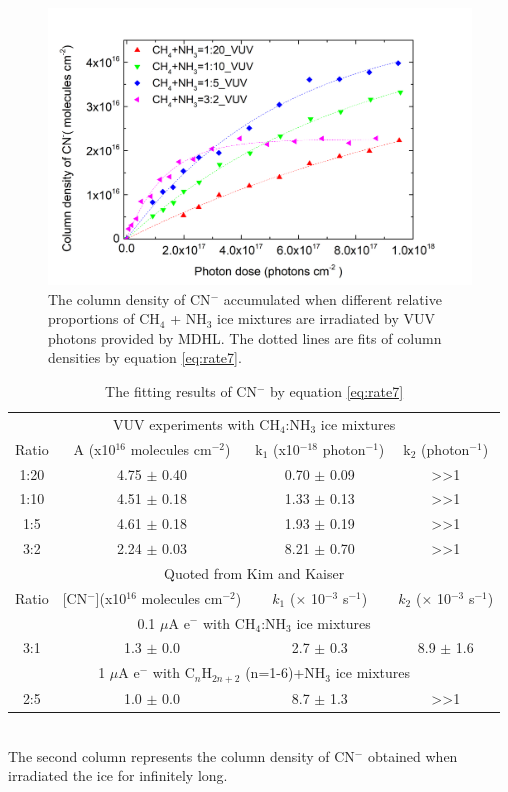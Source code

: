 \begin{figure}
\centering
\includegraphics[width=\textwidth]{figures/chapter3/CN_rate_VUV.png}
\caption{The column density of CN$^-$ accumulated when different relative proportions of CH$_4$ + NH$_3$ ice mixtures are irradiated by VUV photons provided by MDHL. The dotted lines are fits of column densities by equation \ref{eq:rate7}.}
\label{fig:CNrate}
\end{figure}

\begin{table}[htbp]
\caption{The fitting results of CN$^-$ by equation \ref{eq:rate7}}
\label{tab:CNrate}
\begin{tabular}{cccc}
\hline
\hline
\multicolumn{4}{c}{VUV experiments with CH$_4$:NH$_3$ ice mixtures}\\
Ratio & A (x10$^{16}$ molecules cm$^{-2}$) & k$_1$ (x10$^{-18}$ photon$^{-1}$) & k$_2$ (photon$^{-1}$)\\
\hline
1:20 & 4.75 $\pm$ 0.40 & 0.70 $\pm$ 0.09 & >>1 \\
1:10 & 4.51 $\pm$ 0.18 & 1.33 $\pm$ 0.13 & >>1 \\
1:5 & 4.61 $\pm$ 0.18 & 1.93 $\pm$ 0.19 & >>1 \\
3:2 & 2.24 $\pm$ 0.03 & 8.21 $\pm$ 0.70 & >>1 \\
\hline
\hline
\multicolumn{4}{c}{Quoted from Kim and Kaiser\cite{kim}} \\
Ratio & [CN$^-$](x10$^{16}$ molecules cm$^{-2}$) & $k_1$ ($\times$ 10$^{-3}$ s$^{-1}$) &  $k_2$  ($\times$ 10$^{-3}$ s$^{-1}$)\\
\hline
\multicolumn{4}{c}{0.1 $\mu$A e$^-$ with CH$_4$:NH$_3$ ice mixtures}\\
3:1 & 1.3 $\pm$ 0.0 & 2.7 $\pm$ 0.3 & 8.9 $\pm$ 1.6 \\
\hline
\multicolumn{4}{c}{1 $\mu$A e$^-$ with C$_n$H$_{2n+2}$ (n=1-6)+NH$_3$ ice mixtures}\\
2:5 & 1.0 $\pm$ 0.0 & 8.7 $\pm$ 1.3 & >>1 \\
\hline
\end{tabular}\\
The second column represents the column density of CN$^-$ obtained when irradiated the ice for infinitely long.\
\end{table}

